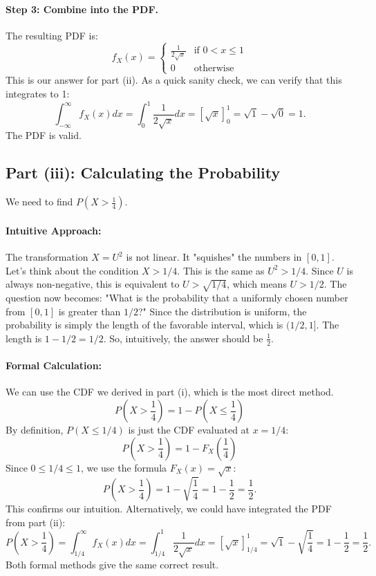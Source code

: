 \documentclass[11pt,a4paper]{article}
\begin{document}
\paragraph{Step 3: Combine into the PDF.}
The resulting PDF is:
\[
f_X(x) =
\begin{cases}
\frac{1}{2\sqrt{x}} & \text{if } 0 < x \leq 1 \\
0 & \text{otherwise}
\end{cases}
\]
This is our answer for part (ii). As a quick sanity check, we can verify that this integrates to 1:
\[ \int_{-\infty}^{\infty} f_X(x) dx = \int_0^1 \frac{1}{2\sqrt{x}} dx = \left[ \sqrt{x} \right]_0^1 = \sqrt{1} - \sqrt{0} = 1. \]
The PDF is valid.

\subsection{Part (iii): Calculating the Probability}

We need to find $P(X > \frac{1}{4})$.

\paragraph{Intuitive Approach:}
The transformation $X=U^2$ is not linear. It "squishes" the numbers in $[0, 1]$.
Let's think about the condition $X > 1/4$. This is the same as $U^2 > 1/4$. Since $U$ is always non-negative, this is equivalent to $U > \sqrt{1/4}$, which means $U > 1/2$.
The question now becomes: "What is the probability that a uniformly chosen number from $[0, 1]$ is greater than $1/2$?" Since the distribution is uniform, the probability is simply the length of the favorable interval, which is $(1/2, 1]$. The length is $1 - 1/2 = 1/2$.
So, intuitively, the answer should be $\frac{1}{2}$.

\paragraph{Formal Calculation:}
We can use the CDF we derived in part (i), which is the most direct method.
\[
P\left(X > \frac{1}{4}\right) = 1 - P\left(X \leq \frac{1}{4}\right)
\]
By definition, $P(X \leq 1/4)$ is just the CDF evaluated at $x = 1/4$:
\[
P\left(X > \frac{1}{4}\right) = 1 - F_X\left(\frac{1}{4}\right)
\]
Since $0 \leq 1/4 \leq 1$, we use the formula $F_X(x) = \sqrt{x}$:
\[
P\left(X > \frac{1}{4}\right) = 1 - \sqrt{\frac{1}{4}} = 1 - \frac{1}{2} = \frac{1}{2}.
\]
This confirms our intuition. Alternatively, we could have integrated the PDF from part (ii):
\[
P\left(X > \frac{1}{4}\right) = \int_{1/4}^{\infty} f_X(x) dx = \int_{1/4}^{1} \frac{1}{2\sqrt{x}} dx = \left[ \sqrt{x} \right]_{1/4}^{1} = \sqrt{1} - \sqrt{\frac{1}{4}} = 1 - \frac{1}{2} = \frac{1}{2}.
\]
Both formal methods give the same correct result.
\end{document}
